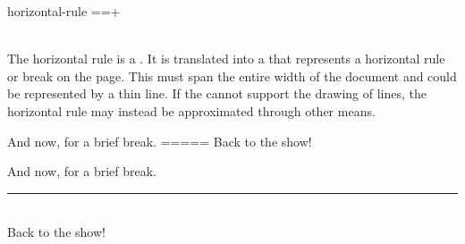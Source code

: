 \begin{identifier}{horizontal-rule}
==+
\end{identifier}
 \\

The horizontal rule is a . It is translated into a  that represents a horizontal rule or break on the page. This must span the entire width of the document and could be represented by a thin line. If the  cannot support the drawing of lines, the horizontal rule may instead be approximated through other means.\\

\begin{examples}
  \example{==}{\rule{0.5\textwidth}{1pt}}
  \begin{examplesource}
And now, for a brief break.
=====
Back to the show!
  \end{examplesource}
  \begin{exampleoutput}
    And now, for a brief break. \\
    \rule{0.5\textwidth}{1pt} \\
    Back to the show!
  \end{exampleoutput}
\end{examples}

